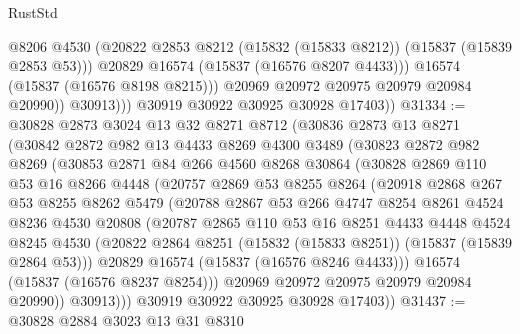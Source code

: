 \begin{lexlean}{RustStd}
\begin{coremodule}
{\begin{coremodule}
{{{{{{{{{{{{{{{{{{{{{{{{{{{{{{{{{{{{{{{{{{{{{{{{{{{{{{{{{{{{                      @8206
                      @4530
                      (@20822 @2853 @8212 (@15832 (@15833 @8212)) (@15837 (@15839 @2853 @53)))
                      @20829
                      @16574
                      (@15837 (@16576 @8207 @4433)))
                    @16574
                    (@15837 (@16576 @8198 @8215)))
                  @20969
                  @20972
                  @20975
                  @20979
                  @20984
                  @20990))
              @30913)))
        @30919
        @30922
        @30925
        @30928
        @17403))
@31334 := @30828
    @2873
    @3024
    @13
    @32
    @8271
    @8712
    (@30836
      @2873
      @13
      @8271
      (@30842
        @2872
        @982
        @13
        @4433
        @8269
        @4300
        @3489
        (@30823
          @2872
          @982
          @8269
          (@30853
            @2871
            @84
            @266
            @4560
            @8268
            @30864
            (@30828
              @2869
              @110
              @53
              @16
              @8266
              @4448
              (@20757
                @2869
                @53
                @8255
                @8264
                (@20918
                  @2868
                  @267
                  @53
                  @8255
                  @8262
                  @5479
                  (@20788
                    @2867
                    @53
                    @266
                    @4747
                    @8254
                    @8261
                    @4524
                    @8236
                    @4530
                    @20808
                    (@20787
                      @2865
                      @110
                      @53
                      @16
                      @8251
                      @4433
                      @4448
                      @4524
                      @8245
                      @4530
                      (@20822 @2864 @8251 (@15832 (@15833 @8251)) (@15837 (@15839 @2864 @53)))
                      @20829
                      @16574
                      (@15837 (@16576 @8246 @4433)))
                    @16574
                    (@15837 (@16576 @8237 @8254)))
                  @20969
                  @20972
                  @20975
                  @20979
                  @20984
                  @20990))
              @30913)))
        @30919
        @30922
        @30925
        @30928
        @17403))
@31437 := @30828
    @2884
    @3023
    @13
    @31
    @8310
}}}}}}}}}}}}}}}}}}}}}}}}}}}}}}}}}}}}}}}}}}}}}}}}}}}}}}}}}}}}
\end{coremodule}}
\end{coremodule}
\end{lexlean}
